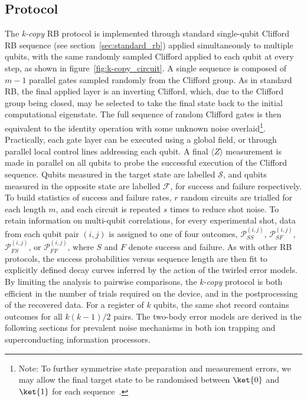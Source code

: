 \subsection{Protocol}
The \emph{k-copy} RB protocol is implemented through standard single-qubit Clifford RB sequence (see section~\ref{sec:standard_rb}) applied simultaneously to multiple qubits, with the same randomly sampled Clifford applied to each qubit at every step, as shown in figure~\ref{fig:k-copy_circuit}. A single sequence is composed of $m-1$ parallel gates sampled randomly from the Clifford group. As in standard RB, the final applied layer is an inverting Clifford, which, due to the Clifford group being closed, may be selected to take the final state back to the initial computational eigenstate. The full sequence of random Clifford gates is then equivalent to the identity operation with some unknown noise overlaid\footnote{Note: To further symmetrise state preparation and measurement errors, we may allow the final target state to be randomised between $\ket{0}$ and $\ket{1}$ for each sequence~\cite{knill_randomized_2008}.}.
Practically, each gate layer can be executed using a global field, or through parallel local control lines addressing each qubit. A final $\langle Z\rangle$ measurement is made in parallel on all qubits to probe the successful execution of the Clifford sequence. Qubits measured in the target state are labelled $\mathcal{S}$, and qubits measured in the opposite state are labelled $\mathcal{F}$, for success and failure respectively. To build statistics of success and failure rates, $r$ random circuits are trialled for each length $m$, and each circuit is repeated $s$ times to reduce shot noise.
To retain information on multi-qubit correlations, for every experimental shot, data from each qubit pair $(i,j)$ is assigned to one of four outcomes, $\mathcal{P}_{SS}^{(i,j)}$, $\mathcal{P}_{SF}^{(i,j)}$, $\mathcal{P}_{FS}^{(i,j)}$, or $\mathcal{P}_{FF}^{(i,j)}$, where $S$ and $F$ denote success and failure. As with other RB protocols, the success probabilities versus sequence length are then fit to explicitly defined decay curves inferred by the action of the twirled error models. \\
By limiting the analysis to pairwise comparisons, the \emph{k-copy} protocol is both efficient in the number of trials required on the device, and in the postprocessing of the recovered data. For a register of $k$ qubits, the same shot record contains outcomes for all $k(k-1)/2$ pairs. 
The two-body error models are derived in the following sections for prevalent noise mechanisms in both ion trapping and superconducting information processors. 

